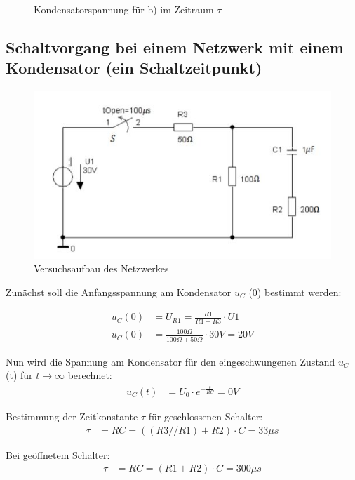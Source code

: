 \documentclass{article}
\begin{document}
\begin{figure}[h]
  \caption{Kondensatorspannung für b) im Zeitraum $\tau$}
  \label{fig:con1}
\end{figure}


\subsection{Schaltvorgang bei einem Netzwerk mit einem Kondensator (ein Schaltzeitpunkt)}

\begin{figure}[h]
  \begin{center}
    \includegraphics[scale=1]{../assets/images/ET2P5/vorbereitung 2.jpg}
    \caption{Versuchsaufbau des Netzwerkes}
  \end{center}
\end{figure}

Zunächst soll die Anfangsspannung am Kondensator $u_C$ (0) bestimmt werden:

\begin{align*}
  u_C(0) &= U_{R1} = \frac{R1}{R1+R3} \cdot U1 \\
  u_C(0) &= \frac{100\Omega}{100\Omega + 50\Omega} \cdot 30V = 20V
\end{align*}

Nun wird die Spannung am Kondensator für den eingeschwungenen Zustand $u_C$ (t) für $t \rightarrow \infty$ berechnet:
\begin{align*}
  u_C(t)&= U_0 \cdot e^{-\frac{t}{RC}} = 0V
\end{align*}

Bestimmung der Zeitkonstante $\tau$ für geschlossenen Schalter:
\begin{align*}
  \tau &= RC = ((R3 // R1) + R2) \cdot C = 33\mu s
\end{align*}

Bei geöffnetem Schalter:
\begin{align*}
  \tau &= RC = (R1 + R2) \cdot C = 300\mu s
\end{align*}
\end{document}
